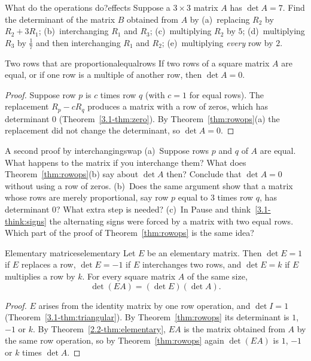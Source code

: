 \documentclass[11pt]{article}
\begin{document}
\begin{kc}{What do the operations do?}{effects}
Suppose a $3\times3$ matrix $A$ has $\det A=7$. Find the determinant of the matrix $B$ obtained from $A$ by (a)~replacing $R_2$ by $R_2+3R_1$; (b)~interchanging $R_1$ and $R_3$; (c)~multiplying $R_2$ by $5$; (d)~multiplying $R_3$ by $\tfrac17$ and then interchanging $R_1$ and $R_2$; (e)~multiplying \emph{every} row by $2$.
\end{kc}

\begin{thm}{Two rows that are proportional}{equalrows}
If two rows of a square matrix $A$ are equal, or if one row is a multiple of another row, then $\det A=0$.
\end{thm}

\begin{proof}
Suppose row $p$ is $c$ times row $q$ (with $c=1$ for equal rows). The replacement $R_p-cR_q$ produces a matrix with a row of zeros, which has determinant $0$ (Theorem~\ref{3.1-thm:zero}). By Theorem~\ref{thm:rowops}(a) the replacement did not change the determinant, so $\det A=0$.
\end{proof}

\begin{think}{A second proof by interchanging}{swap}
(a)~Suppose rows $p$ and $q$ of $A$ are equal. What happens to the matrix if you interchange them? What does Theorem~\ref{thm:rowops}(b) say about $\det A$ then? Conclude that $\det A=0$ without using a row of zeros. (b)~Does the same argument show that a matrix whose rows are merely proportional, say row $p$ equal to $3$ times row $q$, has determinant $0$? What extra step is needed? (c)~In Pause and think~\ref{3.1-think:signs} the alternating signs were forced by a matrix with two equal rows. Which part of the proof of Theorem~\ref{thm:rowops} is the same idea?
\end{think}

\begin{thm}{Elementary matrices}{elementary}
Let $E$ be an elementary matrix. Then $\det E=1$ if $E$ replaces a row, $\det E=-1$ if $E$ interchanges two rows, and $\det E=k$ if $E$ multiplies a row by $k$. For every square matrix $A$ of the same size,
\[
\det(EA)=(\det E)(\det A).
\]
\end{thm}

\begin{proof}
$E$ arises from the identity matrix by one row operation, and $\det I=1$ (Theorem~\ref{3.1-thm:triangular}). By Theorem~\ref{thm:rowops} its determinant is $1$, $-1$ or $k$. By Theorem~\ref{2.2-thm:elementary}, $EA$ is the matrix obtained from $A$ by the same row operation, so by Theorem~\ref{thm:rowops} again $\det(EA)$ is $1$, $-1$ or $k$ times $\det A$.
\end{proof}
\end{document}
